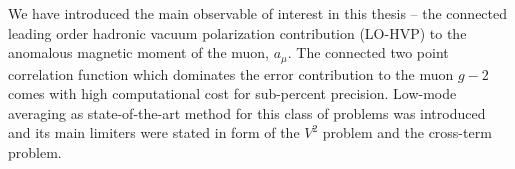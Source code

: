 We have introduced the main observable of interest in this thesis -- the connected leading order hadronic vacuum polarization contribution (LO-HVP) to the anomalous magnetic moment of the muon, $a_{\mu}$.
The connected two point correlation function which dominates the error contribution to the muon $g-2$ comes with high computational cost for sub-percent precision.
Low-mode averaging as state-of-the-art method for this class of problems was introduced and its main limiters were stated in form of the $V^{2}$ problem and the cross-term problem.

